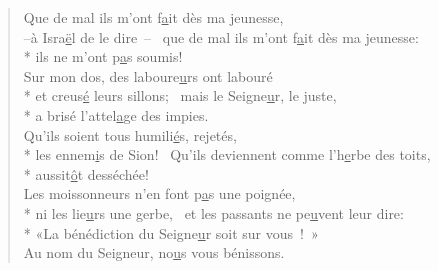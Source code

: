 
\begin{verse}
Que de mal ils m’ont f\underline{a}it dès ma jeunesse, \\
–à Isra\underline{ë}l de le dire – \psalmstar
{}que de mal ils m’ont f\underline{a}it dès ma jeunesse: \\*
ils ne m’ont p\underline{a}s soumis! \\

Sur mon dos, des laboure\underline{u}rs ont labouré \\*
et creus\underline{é} leurs sillons;~\psalmstar
{}mais le Seigne\underline{u}r, le juste, \\*
a brisé l’attel\underline{a}ge des impies. \\

Qu’ils soient tous humili\underline{é}s, rejetés, \\*
les ennem\underline{i}s de Sion!~\psalmstar
{}Qu’ils deviennent comme l’h\underline{e}rbe des toits, \\*
aussit\underline{ô}t desséchée! \\

Les moissonneurs n’en font p\underline{a}s une poignée, \\*
ni les lie\underline{u}rs une gerbe,~\psalmstar
{}et les passants ne pe\underline{u}vent leur dire: \\*
«La bénédiction du Seigne\underline{u}r soit sur vous ! » \\

Au nom du Seigneur, no\underline{u}s vous bénissons. \\
\end{verse}

